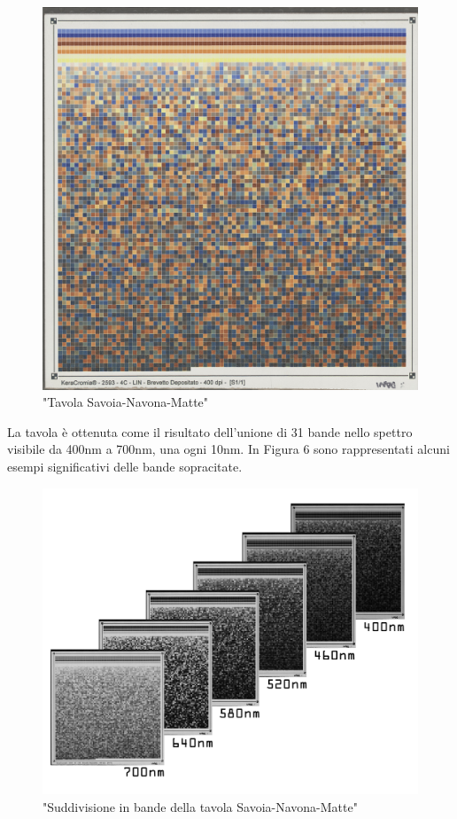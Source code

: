\documentclass[a4paper,11pt]{article}
\begin{document}
    \begin{figure}[h]
        \centering
        \includegraphics[scale=0.4]{tavola}
        \caption{"Tavola Savoia-Navona-Matte"}
    \end{figure}

    La tavola è ottenuta come il risultato dell'unione di 31 bande nello spettro visibile da 400nm a 700nm, una ogni 10nm.
    In Figura 6 sono rappresentati alcuni esempi significativi delle bande sopracitate.
    \begin{figure}[h]
        \centering
        \includegraphics[scale=0.15]{tavola2}
        \caption{"Suddivisione in bande della tavola Savoia-Navona-Matte"}
    \end{figure}
    \newpage
\end{document}
